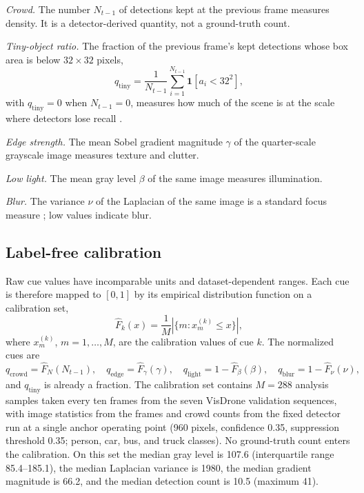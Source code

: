 \emph{Crowd.} The number $N_{t-1}$ of detections kept at the previous frame measures density. It is a detector-derived quantity, not a ground-truth count.

\emph{Tiny-object ratio.} The fraction of the previous frame's kept detections whose box area is below $32\times32$ pixels,
\begin{equation}
q_{\mathrm{tiny}} = \frac{1}{N_{t-1}} \sum_{i=1}^{N_{t-1}} \mathbf{1}\left[a_i < 32^2\right],
\label{eq:ch4-tiny}
\end{equation}
with $q_{\mathrm{tiny}}=0$ when $N_{t-1}=0$, measures how much of the scene is at the scale where detectors lose recall \cite{cheng2023smallobject}.

\emph{Edge strength.} The mean Sobel gradient magnitude $\gamma$ of the quarter-scale grayscale image measures texture and clutter.

\emph{Low light.} The mean gray level $\beta$ of the same image measures illumination.

\emph{Blur.} The variance $\nu$ of the Laplacian of the same image is a standard focus measure \cite{pechpacheco2000blur}; low values indicate blur.

\subsection{Label-free calibration}
Raw cue values have incomparable units and dataset-dependent ranges. Each cue is therefore mapped to $[0,1]$ by its empirical distribution function on a calibration set,
\begin{equation}
\hat F_k(x) = \frac{1}{M} \left|\{ m : x_m^{(k)} \le x \}\right|,
\label{eq:ch4-rank}
\end{equation}
where $x_m^{(k)}$, $m=1,\ldots,M$, are the calibration values of cue $k$. The normalized cues are
\begin{equation}
q_{\mathrm{crowd}}=\hat F_{N}(N_{t-1}),\quad q_{\mathrm{edge}}=\hat F_{\gamma}(\gamma),\quad q_{\mathrm{light}}=1-\hat F_{\beta}(\beta),\quad q_{\mathrm{blur}}=1-\hat F_{\nu}(\nu),
\label{eq:ch4-cues}
\end{equation}
and $q_{\mathrm{tiny}}$ is already a fraction. The calibration set contains $M=288$ analysis samples taken every ten frames from the seven VisDrone validation sequences, with image statistics from the frames and crowd counts from the fixed detector run at a single anchor operating point (960 pixels, confidence 0.35, suppression threshold 0.35; person, car, bus, and truck classes). No ground-truth count enters the calibration. On this set the median gray level is 107.6 (interquartile range 85.4--185.1), the median Laplacian variance is 1980, the median gradient magnitude is 66.2, and the median detection count is 10.5 (maximum 41).

